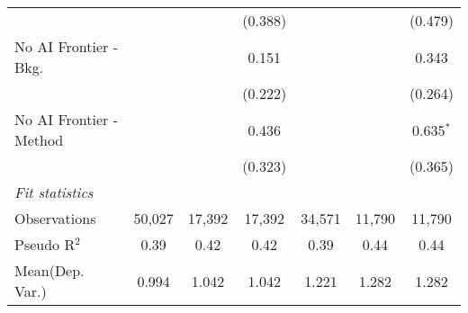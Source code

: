 \begin{tabular}{lcccccc}
                           &              &              & (0.388)     &         &         & (0.479)\\   
   No AI Frontier - Bkg.   &              &              & 0.151       &         &         & 0.343\\   
                           &              &              & (0.222)     &         &         & (0.264)\\   
   No AI Frontier - Method &              &              & 0.436       &         &         & 0.635$^{*}$\\   
                           &              &              & (0.323)     &         &         & (0.365)\\   
   \midrule
   \emph{Fit statistics}\\
   Observations            & 50,027       & 17,392       & 17,392      & 34,571  & 11,790  & 11,790\\  
   Pseudo R$^2$            & 0.39         & 0.42         & 0.42        & 0.39    & 0.44    & 0.44\\  
Mean(Dep. Var.) & 0.994 & 1.042 & 1.042 & 1.221 & 1.282 & 1.282 \\
   

\end{tabular}
